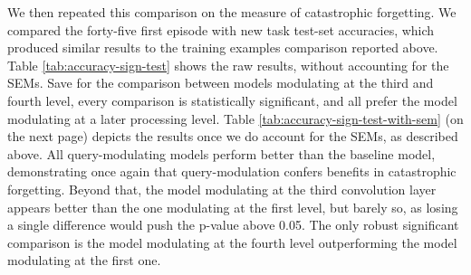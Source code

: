 We then repeated this comparison on the measure of catastrophic forgetting. We compared the forty-five first episode with new task test-set accuracies, which produced similar results to the training examples comparison reported above. Table \ref{tab:accuracy-sign-test} shows the raw results, without accounting for the SEMs. Save for the comparison between models modulating at the third and fourth level, every comparison is statistically significant, and all prefer the model modulating at a later processing level. Table \ref{tab:accuracy-sign-test-with-sem} (on the next page) depicts the results once we do account for the SEMs, as described above. All query-modulating models perform better than the baseline model, demonstrating once again that query-modulation confers benefits in catastrophic forgetting. Beyond that, the model modulating at the third convolution layer appears better than the one modulating at the first level, but barely so, as losing a single difference would push the p-value above 0.05. The only robust significant comparison is the model modulating at the fourth level outperforming the model modulating at the first one.

